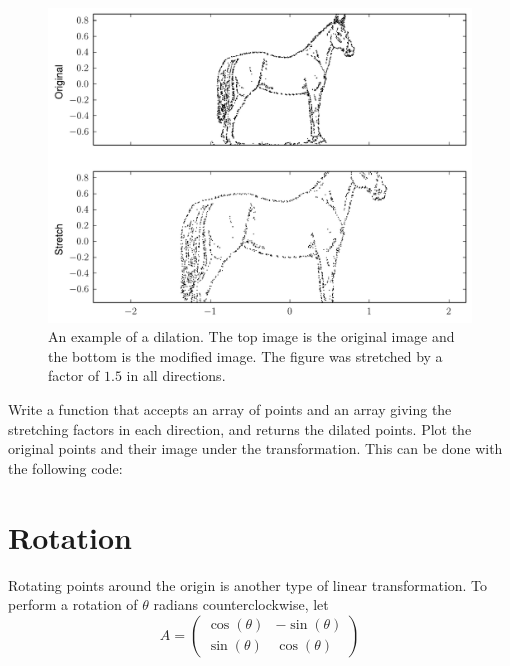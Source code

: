\begin{figure}
\centering
\includegraphics[width=\textwidth]{stretch.pdf}
\caption{An example of a dilation. The top image is the original image and the bottom is the modified image. The figure was stretched by a factor of $1.5$ in all directions.}
\end{figure}

\begin{problem}
Write a function that accepts an array of points and an array giving the stretching factors in each direction, and returns the dilated points. Plot the original points and their image under the transformation. This can be done with the following code:



\end{problem}

\section*{Rotation}
Rotating points around the origin is another type of linear transformation. To perform a rotation of $\theta$ radians counterclockwise, let
\[
A = \begin{pmatrix}
\cos(\theta) & -\sin(\theta) \\
\sin(\theta) & \cos(\theta)
\end{pmatrix}
\]

